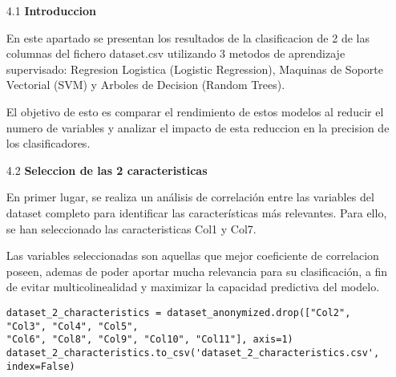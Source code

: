 \documentclass{article}
\begin{document}
\begin{itemize}

\item[4.1]  {\bf Introduccion}

En este apartado se presentan los resultados de la clasificacion de 2 de las columnas del fichero dataset.csv utilizando 3 metodos de aprendizaje supervisado: Regresion Logistica (Logistic Regression), Maquinas de Soporte Vectorial (SVM) y Arboles de Decision (Random Trees).

El objetivo de esto es comparar el rendimiento de estos modelos al reducir el numero de variables y analizar el impacto de esta reduccion en la precision de los clasificadores.

\end{itemize}

\bigskip

\begin{itemize}

\item[4.2]  {\bf Seleccion de las 2 caracteristicas}

En primer lugar, se realiza un análisis de correlación entre las variables del dataset completo para identificar las características más relevantes. Para ello, se han seleccionado las caracteristicas Col1 y Col7.

Las variables seleccionadas son aquellas que mejor coeficiente de correlacion poseen, ademas de poder aportar mucha relevancia para su clasificación, a fin de evitar multicolinealidad y maximizar la capacidad predictiva del modelo.

\begin{tcolorbox}[width=14cm]
\begin{scriptsize}
\begin{verbatim}
dataset_2_characteristics = dataset_anonymized.drop(["Col2", "Col3", "Col4", "Col5",
"Col6", "Col8", "Col9", "Col10", "Col11"], axis=1)
dataset_2_characteristics.to_csv('dataset_2_characteristics.csv', index=False)
\end{verbatim}
\end{scriptsize}
\end{tcolorbox}

\end{itemize}

\bigskip
\end{document}
